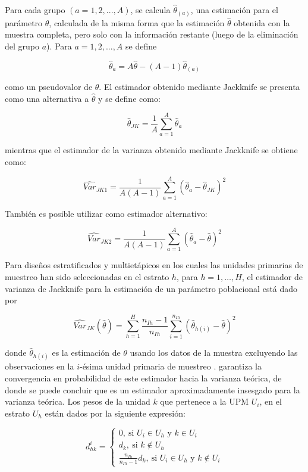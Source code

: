 \documentclass[
  12pt,
]{book}
\begin{document}
Para cada grupo \((a=1,2,...,A)\), se calcula \(\hat{\theta}_{(a)}\), una estimación para el parámetro \(\theta\), calculada de la misma forma que la estimación \(\hat{\theta}\) obtenida con la muestra completa, pero solo con la información restante (luego de la eliminación del grupo \(a\)). Para \(a=1,2,...,A\) se define

\[\hat{\theta}_{a}=A\hat{\theta}-(A-1)\hat{\theta}_{(a)}\]

como un pseudovalor de \(\theta\). El estimador obtenido mediante Jackknife se presenta como una alternativa a \(\hat{\theta}\) y se define como:

\[\hat{\theta}_{JK}=\dfrac{1}{A}\sum_{a=1}^{A}\hat{\theta}_{a}\]

mientras que el estimador de la varianza obtenido mediante Jackknife se obtiene como:

\[\widehat{Var}_{JK1}=\dfrac{1}{A(A-1)}\sum_{a=1}^{A}\left(\hat{\theta}_{a}-\hat{\theta}_{JK}\right)^{2}\]

También es posible utilizar como estimador alternativo:

\[\widehat{Var}_{JK2}=\dfrac{1}{A(A-1)}\sum_{a=1}^{A}\left(\hat{\theta}_{a}-\hat{\theta}\right)^{2}\]

Para diseños estratificados y multietápicos en los cuales las unidades primarias de muestreo han sido seleccionadas en el estrato \(h\), para \(h=1, \ldots, H\), el estimador de varianza de Jackknife para la estimación de un parámetro poblacional está dado por

\[ 
\widehat{Var}_{JK}(\hat{\theta}) = \sum_{h=1}^H \frac{n_{Ih} - 1}{n_{Ih}} \sum_{i=1}^{n_{Ih}}
(\hat{\theta}_{h(i)}-\hat{\theta})^2
\]

donde \(\hat{\theta}_{h(i)}\) es la estimación de \(\theta\) usando los datos de la muestra excluyendo las observaciones en la \(i\)-ésima unidad primaria de muestreo \citep[pg. 29 -- 30]{Korn_Graubard_1999}. \citet[Teorema 6.2]{shao2012jackknife} garantiza la convergencia en probabilidad de este estimador hacia la varianza teórica, de donde se puede concluir que es un estimador aproximadamente insesgado para la varianza teórica. Los pesos de la unidad \(k\) que pertenece a la UPM \(U_i\), en el estrato \(U_h\) están dados por la siguiente expresión:

\[
d_{hk}^i = 
\begin{cases}
0, \ \text{si $U_i \in U_h$ y $k \in U_i$ }\\
d_k, \ \text{si $k \notin U_h$}\\
\frac{n_{Ih}}{n_{Ih}-1}d_k, \ \text{si $U_i \in U_h$ y $k \notin U_i$}
\end{cases}
\]
\end{document}
